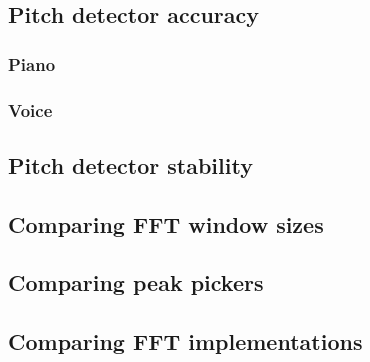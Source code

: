 \subsection{Pitch detector accuracy}





\subsubsection{Piano}
\subsubsection{Voice}
\subsection{Pitch detector stability}
\subsection{Comparing FFT window sizes}
\subsection{Comparing peak pickers}
\subsection{Comparing FFT implementations}